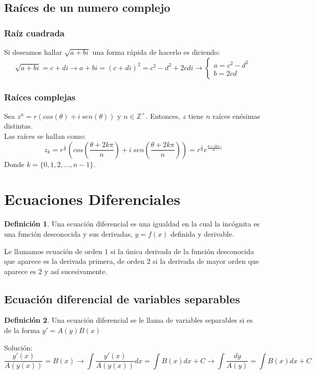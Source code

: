 \documentclass[10pt]{article}
\theoremstyle{definition}
\newtheorem{definition}{Definición}[section]
\begin{document}
\subsection{Raíces de un numero complejo}
\subsubsection{Raíz cuadrada}
Si deseamos hallar $\sqrt{a+bi}$ una forma rápida de hacerlo es diciendo: $$\sqrt{a+bi}=c+di \rightarrow a+bi=(c+di)^2=c^2-d^2+2cdi\rightarrow \begin{cases}a=c^{2} -d^{2}\\b=2cd\end{cases}$$
\newpage \subsubsection{Raíces complejas}
Sea $z^n=r(cos(\theta)+i\ sen(\theta))$ y $n\in \mathbb{Z}^{+}$. Entonces, $z$ tiene $n$ raíces enésimas distintas.\\
Las raíces se hallan como: $$z_k=r^{\frac{1}{n}}\left(cos\left(\frac{\theta +2k\pi}{n}\right)+i\ sen\left(\frac{\theta + 2k\pi}{n}\right)\right)=r^{\frac{1}{n}}e^{\frac{\theta + 2k\pi}{n}i}$$
Donde $k=\{0,1,2,\dots,n-1\}$.
\newpage\section{Ecuaciones Diferenciales}
\begin{definition}
	Una ecuación diferencial es una igualdad en la cual la incógnita es una función desconocida y sus derivadas, $y=f(x)$ definida y derivable.
\end{definition}
Le llamamos ecuación de orden 1 si la única derivada de la función desconocida que aparece es la derivada primera, de orden 2 si la derivada de mayor orden que aparece es 2 y así sucesivamente.
\subsection{Ecuación diferencial de variables separables}
\begin{definition}
	Una ecuación diferencial se le llama de variables separables si es de la forma $y'=A(y)B(x)$
\end{definition}
Solución: $$\frac{y'(x)}{A(y(x))}=B(x)\rightarrow \int \frac{y'(x)}{A(y(x))} dx=\int B(x)dx+C\rightarrow \int \frac{dy}{A(y)}=\int B(x)dx+C$$
\end{document}
